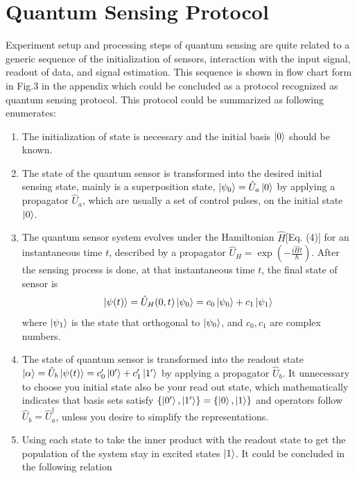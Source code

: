 \documentclass[11pt]{article}
\begin{document}
\section{Quantum Sensing Protocol}

Experiment setup and processing steps of quantum sensing are quite related to a generic sequence of the initialization of sensors, interaction with the input signal, readout of data, and signal estimation. This sequence is shown in flow chart form in Fig.3 in the appendix which could be concluded as a protocol recognized as quantum sensing protocol. This protocol could be summarized as following enumerates\cite{degen2017quantum}:
	\begin{enumerate}
		\item The initialization of state is necessary and the initial basis $\ket{0}$ should be known.
		\item The state of the quantum sensor is transformed into the desired initial sensing state, mainly is a superposition state, $\ket{\psi_0} = \hat{U}_a\ket{0}$ by applying a propagator $\hat{U}_a$, which are usually a set of control pulses, on the initial state $\ket{0}$. 
		\item The quantum sensor system evolves under the Hamiltonian $\hat{H}$[Eq. (4)] for an instantaneous time $t$, described by a propagator $\hat{U}_H = \exp(-\frac{i\hat{H}t}{\hbar})$. After the sensing process is done, at that instantaneous time $t$, the final state of sensor is 
			\begin{equation}
				\ket{\psi(t)} = \hat{U}_H(0,t)\ket{\psi_0} = c_0 \ket{\psi_0} + c_1 \ket{\psi_1}
			\end{equation}
		where $\ket{\psi_1}$ is the state that orthogonal to $\ket{\psi_0}$, and $c_0,c_1$ are complex numbers.
		\item The state of quantum sensor is transformed into the readout state $\ket{\alpha} = \hat{U}_b\ket{\psi(t)} = c'_0\ket{0'} + c'_1\ket{1'}$ by applying a propagator $\hat{U}_b$. It unnecessary to choose you initial state also be your read out state, which mathematically indicates that basis sets satisfy $\{\ket{0'},\ket{1'}\} = \{\ket{0}, \ket{1}\}$ and operators follow $\hat{U}_b = \hat{U}^\dagger_a$, unless you desire to simplify the representations. 
		\item Using each state to take the inner product with the readout state to get the population of the system stay in excited states $\ket{1}$. It could be concluded in the following relation
			\begin{equation}

\end{equation}
\end{enumerate}
\end{document}
